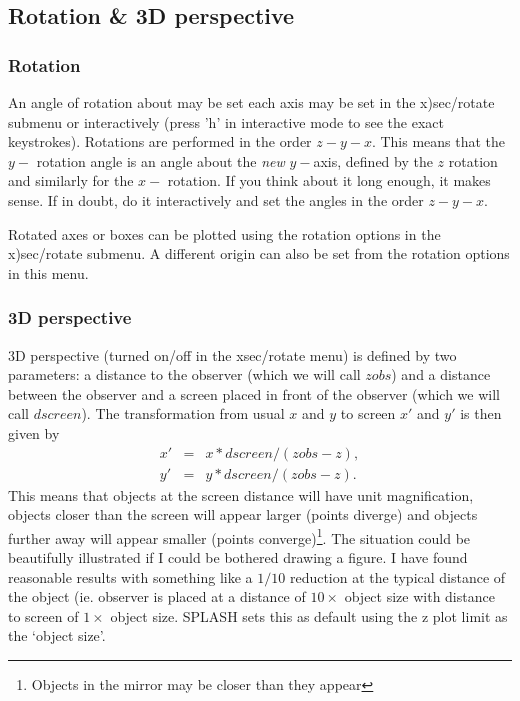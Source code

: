 \documentclass[a4paper,11pt]{article}
\begin{document}
\subsection{Rotation \& 3D perspective}
\subsubsection{Rotation}
 An angle of rotation about may be set each axis may be set in the x)sec/rotate submenu or
interactively (press 'h' in interactive mode to see the exact keystrokes). Rotations are performed in the
order $z-y-x$. This means that the $y-$ rotation angle is an angle about the \emph{new} $y-$axis, defined
by the $z$ rotation and similarly for the $x-$ rotation. If you think about it long enough, it makes
sense. If in doubt, do it interactively and set the angles in the order $z-y-x$.

 Rotated axes or boxes can be plotted using the rotation options in the x)sec/rotate submenu. A
different origin can also be set from the rotation options in this menu.

\subsubsection{3D perspective}
 3D perspective (turned on/off in the xsec/rotate menu) is defined by two parameters: a distance to the observer (which we will call $zobs$) and a distance
between the observer and a screen placed in front of the observer (which we will call $dscreen$).
The transformation from usual $x$ and $y$ to screen $x'$ and $y'$ is then given by
\begin{eqnarray}
x' & = & x*dscreen/(zobs-z), \nonumber \\
y' & = & y*dscreen/(zobs-z).
\end{eqnarray}
 This means that objects at the screen distance will have unit magnification, objects closer than the
screen will appear larger (points diverge) and objects further away will appear smaller (points
converge)\footnote{Objects in the mirror may be closer than they appear}. The situation could be
beautifully illustrated if I could be bothered drawing a figure. I have found reasonable
results with something like a $1/10$ reduction at the typical distance of the object (ie.
observer is placed at a distance of $10\times$ object size with distance to screen of $1\times$ object
size. SPLASH sets this as default using the z plot limit as the `object size'.
\end{document}
